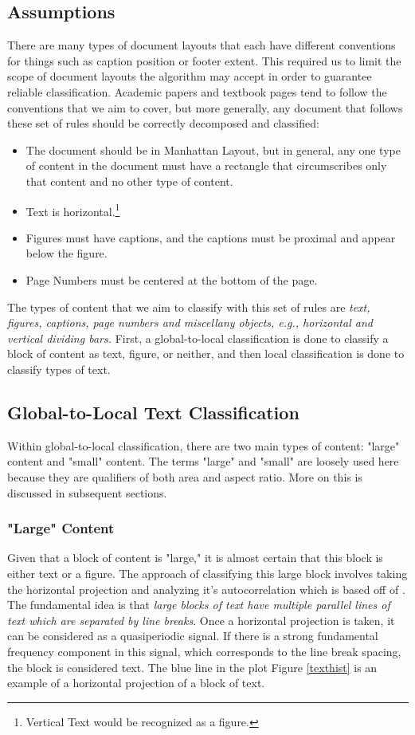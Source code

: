 \documentclass{report}
\begin{document}
\subsection{Assumptions} 
There are many types of document layouts that each have different conventions for things such as caption position or footer extent. This required us to limit the scope of document layouts the algorithm may accept in order to guarantee reliable classification. Academic papers and textbook pages tend to follow the conventions that we aim to cover, but more generally, any document that follows these set of rules should be correctly decomposed and classified:

\begin{itemize}
\item The document should be in Manhattan Layout, but in general, any one type of content in the document must have a rectangle that circumscribes only that content and no other type of content.
\item Text is horizontal.\footnote{Vertical Text would be recognized as a figure.}
\item Figures must have captions, and the captions must be proximal and appear below the figure.
\item Page Numbers must be centered at the bottom of the page.
\end{itemize}


The types of content that we aim to classify with this set of rules are \textit{text, figures, captions, page numbers and miscellany objects, e.g., horizontal and vertical dividing bars.} First, a global-to-local classification is done to classify a block of content as text, figure, or neither, and then local classification is done to classify types of text.

\subsection{Global-to-Local Text Classification}
Within global-to-local classification, there are two main types of content: "large" content and "small" content. The terms "large" and "small" are loosely used here because they are qualifiers of both area and aspect ratio. More on this is discussed in subsequent sections.

\subsubsection{"Large" Content}
Given that a block of content is "large," it is almost certain that this block is either text or a figure. The approach of classifying this large block involves taking the horizontal projection and analyzing it's autocorrelation which is based off of \cite{BairdOrig}. The fundamental idea is that \emph{large blocks of text have multiple parallel lines of text which are separated by line breaks}. Once a horizontal projection is taken, it can be considered as a quasiperiodic signal. If there is a strong fundamental frequency component in this signal, which corresponds to the line break spacing, the block is considered text. The blue line in the plot Figure \ref{texthist} is an example of a horizontal projection of a block of text.
\end{document}
